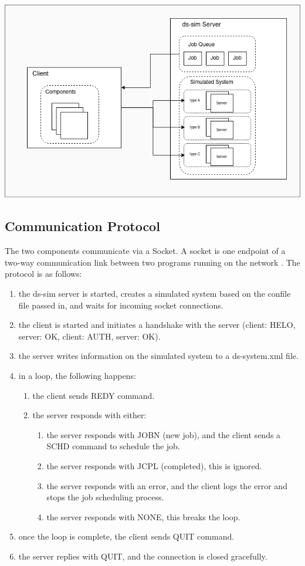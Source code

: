 \documentclass[a4paper]{article}
\begin{document}
\begin{center}
    \includegraphics[scale=0.4]{images/ds-sim.png}
\end{center}

\subsection{Communication Protocol}
The two components communicate via a Socket. A socket is one endpoint of a two-way communication link between two programs running on the network \cite{sockets}.
The protocol is as follows:
\begin{enumerate}
  \item the ds-sim server is started, creates a simulated system based on the confile file passed in, and waits for incoming socket connections.
  \item the client is started and initiates a handshake with the server (client: HELO, server: OK, client: AUTH, server: OK).
  \item the server writes information on the simulated system to a ds-system.xml file.
  \item in a loop, the following happens:
  \begin{enumerate}
      \item the client sends REDY command.
      \item the server responds with either:
      \begin{enumerate}
          \item the server responds with JOBN (new job), and the client sends a SCHD command to schedule the job.
          \item the server responds with JCPL (completed), this is ignored.
          \item the server responds with an error, and the client logs the error and stops the job scheduling process.
          \item the server responds with NONE, this breaks the loop.
      \end{enumerate}
  \end{enumerate}
  \item once the loop is complete, the client sends QUIT command.
  \item the server replies with QUIT, and the connection is closed gracefully.
\end{enumerate}
\end{document}
